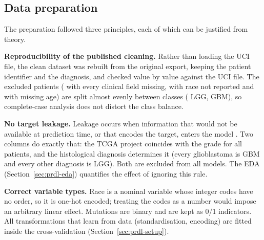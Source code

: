 \subsection{Data preparation}

The preparation followed three principles, each of which can be justified from theory.

\textbf{Reproducibility of the published cleaning.} Rather than loading the UCI file, the clean
dataset was rebuilt from the original export, keeping the patient identifier and the diagnosis,
and checked value by value against the UCI file. The \NRemoved{} excluded patients
(\NRemovedAllMissing{} with every clinical field missing, \NRemovedRace{} with race not reported and
\NRemovedAge{} with missing age) are split almost evenly between classes (\NRemovedLGG{} LGG,
\NRemovedGBM{} GBM), so complete-case analysis does not distort the class balance.

\textbf{No target leakage.} Leakage occurs when information that would not be available at
prediction time, or that encodes the target, enters the model \cite{kaufman2012}. Two columns do
exactly that: the TCGA project coincides with the grade for all \NProjectGrade{} patients, and the
histological diagnosis determines it (every glioblastoma is GBM and every other diagnosis is LGG).
Both are excluded from all models. The EDA (Section~\ref{sec:prdl-eda}) quantifies the effect of
ignoring this rule.

\textbf{Correct variable types.} Race is a nominal variable whose integer codes have no order, so
it is one-hot encoded; treating the codes as a number would impose an arbitrary linear effect.
Mutations are binary and are kept as 0/1 indicators. All transformations that learn from data
(standardisation, encoding) are fitted inside the cross-validation (Section~\ref{sec:prdl-setup}).
